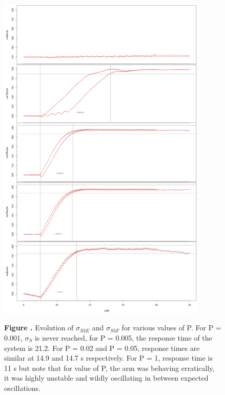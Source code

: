 \documentclass{report}
\begin{document}
\begin{figure}[h!]
\begin{center}
\includegraphics[width=10cm]{figures/varying_P-ss3.png}
\end{center}
 \textbf{\label{fig:05} Figure . }{Evolution of $\sigma_{S3E}$ and $\sigma_{S3F}$  for various values of P. For P = 0.001, $\sigma_{S}$ is never reached, for P = 0.005, the response time of the system is 21.2. For P = 0.02 and P = 0.05, response times are similar at 14.9 and 14.7 s respectively. For P = 1, response time is 11 s but note that for value of P, the arm was behaving erratically, it was highly unstable and wildly oscillating in between expected oscillations.}
\end{figure}
\end{document}
